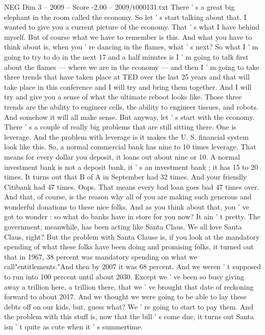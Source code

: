\begin{textsample}{NEG Dim 3 – 2009 – Score -2.00 – 2009/t000131.txt}  \label{ex:f3_neg_029}
There ' s a great big elephant in the room called the economy.
So let ' s start talking about that.
I wanted to give you a current picture of the economy.
That ' s what I have behind myself.
But of course what we have to remember is this.
And what you have to think about is, when you ' re dancing in the flames, what ' s next?
So what I ' m going to try to do in the next 17 and a half minutes is I ' m going to talk first about the flames — where we are in the economy — and then I ' m going to take three trends that have taken place at TED over the last 25 years and that will take place in this conference and I will try and bring them together.
And I will try and give you a sense of what the ultimate reboot looks like.
Those three trends are the ability to engineer cells, the ability to engineer tissues, and robots.
And somehow it will all make sense.
But anyway, let ' s start with the economy.
There ' s a couple of really big problems that are still sitting there.
One is leverage.
And the problem with leverage is it makes the U.
S. financial system look like this.
So, a normal commercial bank has nine to 10 times leverage.
That means for every dollar you deposit, it loans out about nine or 10.
A normal investment bank is not a deposit bank, it ' s an investment bank ; it has 15 to 20 times.
It turns out that B of A in September had 32 times.
And your friendly Citibank had 47 times.
Oops.
That means every bad loan goes bad 47 times over.
And that, of course, is the reason why all of you are making such generous and wonderful donations to these nice folks.
And as you think about that, you ' ve got to wonder : so what do banks have in store for you now?
It ain ' t pretty.
The government, meanwhile, has been acting like Santa Claus.
We all love Santa Claus, right?
But the problem with Santa Clause is, if you look at the mandatory spending of what these folks have been doing and promising folks, it turned out that in 1967, 38 percent was mandatory spending on what we call"entitlements."And then by 2007 it was 68 percent.
And we weren ' t supposed to run into 100 percent until about 2030.
Except we ' ve been so busy giving away a trillion here, a trillion there, that we ' ve brought that date of reckoning forward to about 2017.
And we thought we were going to be able to lay these debts off on our kids, but, guess what?
We ' re going to start to pay them.
And the problem with this stuff is, now that the bill ' s come due, it turns out Santa isn ' t quite as cute when it ' s summertime.

\end{textsample}
